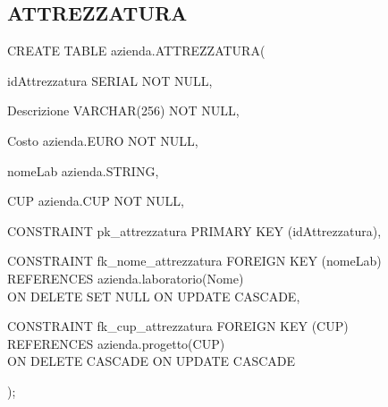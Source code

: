         \subsection{ATTREZZATURA}
            \ttfamily
                \begin{flushleft}
                    \begin{description}
                        \item CREATE TABLE azienda.ATTREZZATURA(                
                        \begin{description}
                            \item idAttrezzatura SERIAL NOT NULL,
                            \item Descrizione VARCHAR(256) NOT NULL,
                            \item Costo azienda.EURO NOT NULL,
                            \item nomeLab azienda.STRING,
                            \item CUP azienda.CUP NOT NULL,
                            
                            \vspace{0.5cm}

                            \item CONSTRAINT pk\_attrezzatura PRIMARY KEY (idAttrezzatura),
                            \item CONSTRAINT fk\_nome\_attrezzatura FOREIGN KEY (nomeLab)\\
                            REFERENCES azienda.laboratorio(Nome)\\
                            ON DELETE SET NULL		ON UPDATE CASCADE,
                            \item CONSTRAINT fk\_cup\_attrezzatura FOREIGN KEY (CUP)\\
                            REFERENCES azienda.progetto(CUP)\\
                            ON DELETE CASCADE	    ON UPDATE CASCADE
                        \end{description}
                        );
                    \end{description}
                \end{flushleft}
            \normalfont


